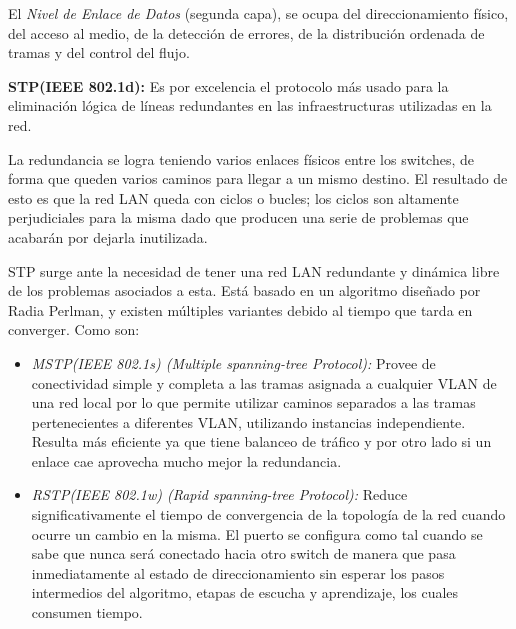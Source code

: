 \documentclass[a4paper,10pt]{article}
\begin{document}
El \textit{Nivel de Enlace de Datos} (segunda capa), se ocupa del direccionamiento físico, del acceso al medio, de la detección de errores, de la distribución ordenada de tramas y del control del flujo. 
 

\textbf{STP(IEEE 802.1d):} Es por excelencia el protocolo más usado para la eliminación lógica de líneas redundantes en las infraestructuras utilizadas en la red. 

La redundancia se logra teniendo varios enlaces físicos entre los switches, de forma que queden varios caminos para llegar a un mismo destino. El resultado de esto es que la red LAN queda con ciclos o bucles; los ciclos son altamente perjudiciales para la misma dado que producen una serie de problemas que acabarán por dejarla inutilizada.

STP surge ante la necesidad de tener una red LAN redundante y dinámica libre de los problemas asociados a esta.  Está basado en un algoritmo diseñado por Radia Perlman, y existen múltiples variantes debido al tiempo que tarda en converger.  Como son:
\begin{itemize}
	\item\textit{ MSTP(IEEE 802.1s) (Multiple spanning-tree Protocol):} Provee de conectividad simple y completa a las tramas asignada a cualquier VLAN de una red local por lo que permite utilizar caminos separados a las tramas pertenecientes a diferentes VLAN, utilizando instancias independiente. 
	Resulta más eficiente ya que tiene balanceo de tráfico y por otro lado si un enlace cae aprovecha mucho mejor la redundancia.
	\item \textit{RSTP(IEEE 802.1w) (Rapid spanning-tree Protocol):} Reduce significativamente el tiempo de convergencia de la topología de la red cuando ocurre un cambio en la misma. 
	El puerto se configura como tal cuando se sabe que nunca será conectado hacia otro switch de manera que pasa inmediatamente al estado de direccionamiento sin esperar los pasos intermedios del algoritmo, etapas de escucha y aprendizaje, los cuales consumen tiempo.
\end{itemize}
\end{document}
